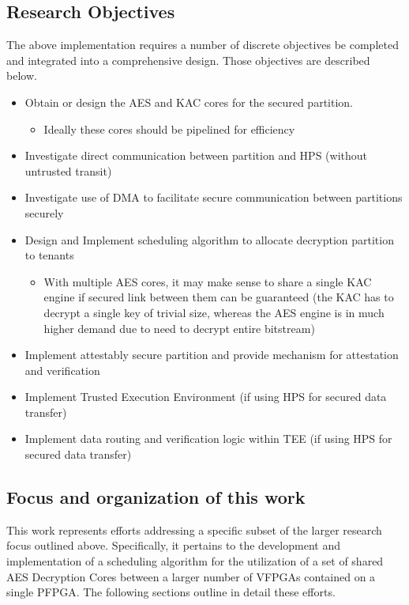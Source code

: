\subsection{Research Objectives}\label{subsec:Obj}
The above implementation requires a number of discrete objectives be completed and integrated into a comprehensive design. Those objectives are described below.

\begin{itemize}
  \item Obtain or design the AES and KAC cores for the secured partition.
    \begin{itemize}  
      \item Ideally these cores should be pipelined for efficiency
    \end{itemize}
  \item Investigate direct communication between partition and HPS (without untrusted transit)
  \item Investigate use of DMA to facilitate secure communication between partitions securely
  \item Design and Implement scheduling algorithm to allocate decryption partition to tenants
    \begin{itemize}
      \item With multiple AES cores, it may make sense to share a single KAC engine if secured link between them can be guaranteed (the KAC has to decrypt a single key of trivial size, whereas the AES engine is in much higher demand due to need to decrypt entire bitstream)
    \end{itemize}
  \item Implement attestably secure partition and provide mechanism for attestation and verification
  \item Implement Trusted Execution Environment (if using HPS for secured data transfer)
  \item Implement data routing and verification logic within TEE (if using HPS for secured data transfer)
  \end{itemize}

  \subsection{Focus and organization of this work}\label{subsec:WorkFocus}
  This work represents efforts addressing a specific subset of the larger research focus outlined above. Specifically, it pertains to the development and implementation of a scheduling algorithm for the utilization of a set of shared AES Decryption Cores between a larger number of VFPGAs contained on a single PFPGA. The following sections outline in detail these efforts.